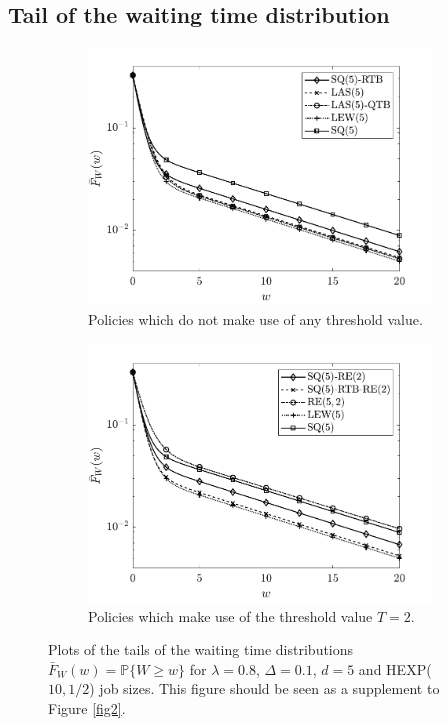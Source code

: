 \documentclass[12pt]{report}
\begin{document}
\subsection{Tail of the waiting time distribution}
\begin{figure}[t]
\begin{center}
\begin{subfigure}{0.43\textwidth}
\centering
\captionsetup{width=.8\linewidth}
\includegraphics[width=1\linewidth]{figures/Chapter7/fig10a.pdf}
\caption{Policies which do not make use of any threshold value.}
\label{fig10a}
\end{subfigure}
\begin{subfigure}{.43\textwidth}
\centering
\captionsetup{width=.8\linewidth}
\includegraphics[width=1\linewidth]{figures/Chapter7/fig10b.pdf}
\caption{Policies which make use of the threshold value $T=2$.}
\label{fig10b}
\end{subfigure}
\caption{Plots of the tails of the waiting time distributions $\bar F_W(w)=\mathbb{P}\{W \geq w\}$ for $\lambda=0.8$, $\Delta=0.1$, $d=5$ and HEXP($10,1/2$) job sizes. This figure should be seen as a supplement to Figure \ref{fig2}.}
\label{fig10}
\end{center}
\end{figure}
\end{document}
